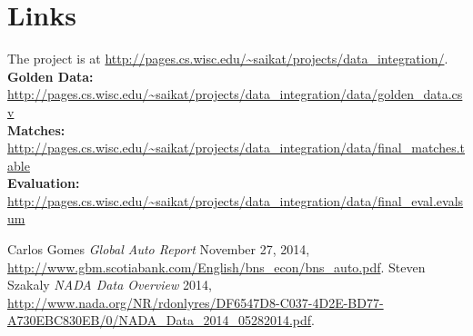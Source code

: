 \documentclass[dvips,11pt]{article}
\begin{document}
\section{Links} 
The project is at \url{http://pages.cs.wisc.edu/~saikat/projects/data_integration/}.
{\bf Golden Data:}
\url{http://pages.cs.wisc.edu/~saikat/projects/data_integration/data/golden_data.csv}\\
{\bf Matches:}
\url{http://pages.cs.wisc.edu/~saikat/projects/data_integration/data/final_matches.table}\\
{\bf Evaluation:}
\url{http://pages.cs.wisc.edu/~saikat/projects/data_integration/data/final_eval.evalsum}\\


%
\begin{thebibliography}{1}

 Carlos Gomes {\em Global Auto Report}  November 27, 2014, \url{http://www.gbm.scotiabank.com/English/bns_econ/bns_auto.pdf}.
 Steven Szakaly {\em NADA Data Overview}  2014, \url{http://www.nada.org/NR/rdonlyres/DF6547D8-C037-4D2E-BD77-A730EBC830EB/0/NADA_Data_2014_05282014.pdf}.

\end{thebibliography}
\end{document}
